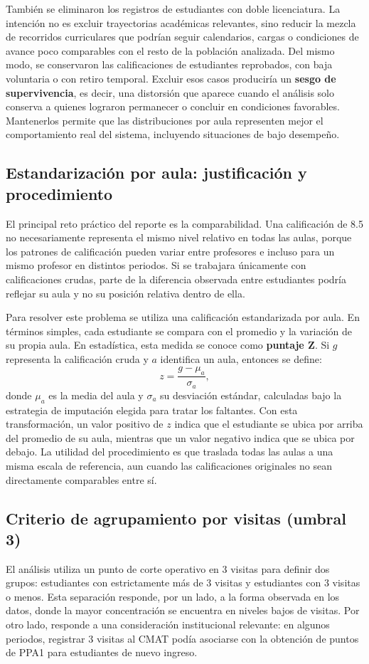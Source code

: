 \documentclass[10pt,letterpaper]{article} %
\numberwithin{figure}{subsection}
\begin{document}
También se eliminaron los registros de estudiantes con doble licenciatura. La intención no es excluir trayectorias académicas relevantes, sino reducir la mezcla de recorridos curriculares que podrían seguir calendarios, cargas o condiciones de avance poco comparables con el resto de la población analizada. Del mismo modo, se conservaron las calificaciones de estudiantes reprobados, con baja voluntaria o con retiro temporal. Excluir esos casos produciría un \textbf{sesgo de supervivencia}, es decir, una distorsión que aparece cuando el análisis solo conserva a quienes lograron permanecer o concluir en condiciones favorables. Mantenerlos permite que las distribuciones por aula representen mejor el comportamiento real del sistema, incluyendo situaciones de bajo desempeño.

\subsection{Estandarización por aula: justificación y procedimiento}
El principal reto práctico del reporte es la comparabilidad. Una calificación de 8.5 no necesariamente representa el mismo nivel relativo en todas las aulas, porque los patrones de calificación pueden variar entre profesores e incluso para un mismo profesor en distintos periodos. Si se trabajara únicamente con calificaciones crudas, parte de la diferencia observada entre estudiantes podría reflejar su aula y no su posición relativa dentro de ella.

Para resolver este problema se utiliza una calificación estandarizada por aula. En términos simples, cada estudiante se compara con el promedio y la variación de su propia aula. En estadística, esta medida se conoce como \textbf{puntaje Z}. Si $g$ representa la calificación cruda y $a$ identifica un aula, entonces se define:
\[
z=\frac{g-\mu_a}{\sigma_a},
\]
donde $\mu_a$ es la media del aula y $\sigma_a$ su desviación estándar, calculadas bajo la estrategia de imputación elegida para tratar los faltantes. Con esta transformación, un valor positivo de $z$ indica que el estudiante se ubica por arriba del promedio de su aula, mientras que un valor negativo indica que se ubica por debajo. La utilidad del procedimiento es que traslada todas las aulas a una misma escala de referencia, aun cuando las calificaciones originales no sean directamente comparables entre sí.

\subsection{Criterio de agrupamiento por visitas (umbral 3)}
El análisis utiliza un punto de corte operativo en 3 visitas para definir dos grupos: estudiantes con estrictamente más de 3 visitas y estudiantes con 3 visitas o menos. Esta separación responde, por un lado, a la forma observada en los datos, donde la mayor concentración se encuentra en niveles bajos de visitas. Por otro lado, responde a una consideración institucional relevante: en algunos periodos, registrar 3 visitas al CMAT podía asociarse con la obtención de puntos de PPA1 para estudiantes de nuevo ingreso.
\end{document}
